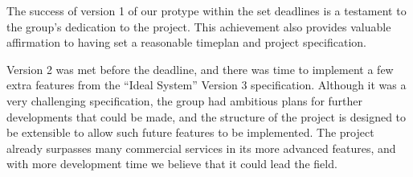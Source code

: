 The success of version 1 of our protype within the set deadlines is a testament to the group's
dedication to the project. This achievement also provides valuable affirmation to having set a reasonable timeplan and project 
specification.

Version 2 was met before the deadline, and there was time to implement a few extra features from the ``Ideal System'' Version 3 specification. Although it was a very challenging specification, the group had ambitious plans for further developments that could be made, and the structure of the project is designed to be extensible to allow such future features to be implemented. The project already surpasses many commercial services in its more advanced features, and with more development time we believe that it could lead the field.
